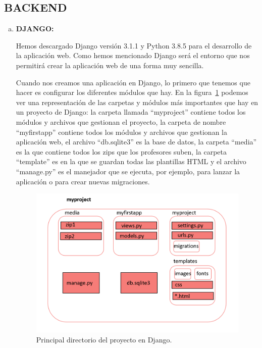 \documentclass[a4paper, 12pt]{book}
\begin{document}
\subsection{BACKEND}
\begin{enumerate} [a)]
    \item \textbf{DJANGO:}
    
    Hemos descargado Django versión 3.1.1 y Python 3.8.5 para el desarrollo de la aplicación web. Como hemos mencionado Django será el entorno que nos permitirá crear la aplicación web de una forma muy sencilla. 
    
    Cuando nos creamos una aplicación en Django, lo primero que tenemos que hacer es configurar los diferentes módulos que hay. En la figura~\ref{figura:carpetas} podemos ver una representación de las carpetas y módulos más importantes que hay en un proyecto de Django: la carpeta llamada ``myproject'' contiene todos los módulos y archivos que gestionan el proyecto, la carpeta de nombre ``myfirstapp'' contiene todos los módulos y archivos que gestionan la aplicación web, el archivo ``db.sqlite3'' es la base de datos, la carpeta ``media'' es la que contiene todos los zips que los profesores suben, la carpeta ``template'' es en la que se guardan todas las plantillas HTML y el archivo ``manage.py'' es el manejador que se ejecuta, por ejemplo, para lanzar la aplicación o para crear nuevas migraciones.
     \begin{figure}[h]
            \centering
            \includegraphics[scale=0.6]{img/carpetas.PNG}
            \caption{Principal directorio del proyecto en Django.}
            \label{figura:carpetas}
        \end{figure}
        

\end{enumerate}
\end{document}
